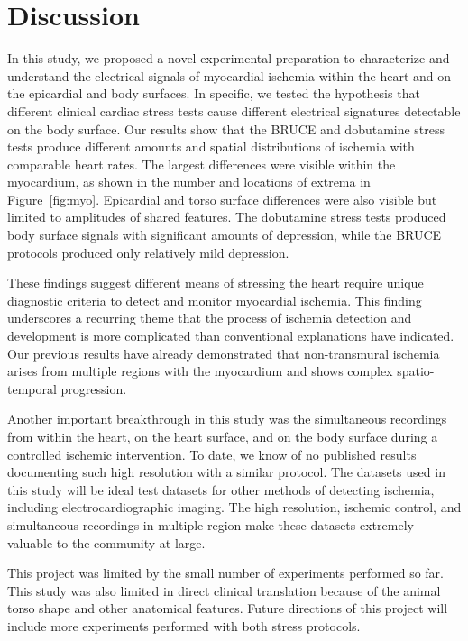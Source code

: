 \documentclass[twocolumn]{cinc}
\begin{document}
\section{Discussion}

In this study, we proposed a novel experimental preparation to
characterize and understand the electrical signals of myocardial ischemia
within the heart and on the epicardial and body surfaces. In specific, we
tested the hypothesis that different clinical cardiac stress tests cause
different electrical signatures detectable on the body surface. Our results
show that  the BRUCE and dobutamine
stress tests produce different amounts and spatial distributions of
ischemia with comparable heart rates. The largest differences were visible within the myocardium,
as shown in the number and locations of extrema in Figure~\ref{fig:myo}.
Epicardial and torso surface differences were also visible but limited to
amplitudes of shared features. The dobutamine stress tests produced body
surface signals with significant amounts of depression, while the BRUCE
protocols produced only relatively mild depression.

These findings suggest different means of
stressing the heart require unique diagnostic criteria to detect and
monitor myocardial ischemia. This finding underscores a recurring theme
that the process of ischemia detection and development is more complicated
than conventional explanations have indicated. Our previous results have
already demonstrated that non-transmural ischemia arises from multiple
regions with the myocardium and shows complex spatio-temporal
progression.\cite{Aras2016}

Another important breakthrough in this study was the simultaneous
recordings from within the heart, on the heart surface, and on the body
surface during a controlled ischemic intervention. To date, we know of no
published results documenting such high resolution with a similar protocol. The datasets used
in this study will be ideal test datasets for other methods of detecting
ischemia, including electrocardiographic imaging. The high resolution,
ischemic control, and simultaneous recordings in multiple region make these
datasets extremely valuable to the community at large.

This project was limited by the small number of
experiments performed so far. This
study was also limited in direct clinical translation because of the
animal torso shape and other anatomical features. Future directions of this
project will include more experiments performed
with both stress protocols.
\end{document}
